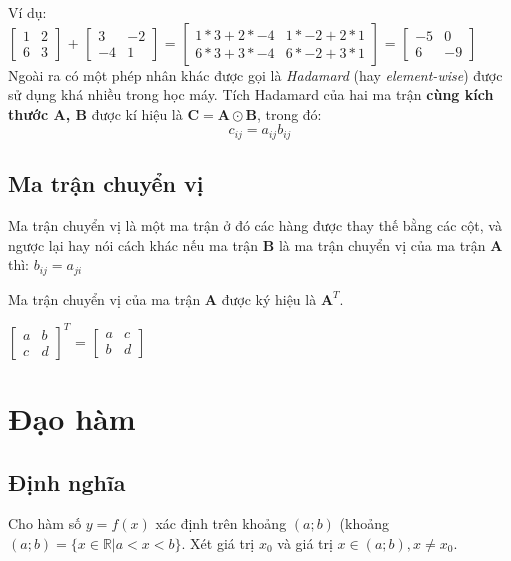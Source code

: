 Ví dụ:\\

$\begin{bmatrix}
   1 & 2 \\6 & 3
\end{bmatrix}$
+ 
$\begin{bmatrix}
3 & -2 \\
-4 & 1
\end{bmatrix}$
=
$\begin{bmatrix}
1 * 3 + 2 * -4 & 1 * -2 + 2 * 1 \\
6 * 3 + 3 * -4  & 6 * -2 + 3 * 1
\end{bmatrix}$
=
$\begin{bmatrix}
-5 & 0\\
6 & -9
\end{bmatrix}$\\

Ngoài ra có một phép nhân khác được gọi là \textit{Hadamard} (hay \textit{element-wise}) được sử dụng khá nhiều trong học máy. Tích Hadamard của hai ma trận \textbf{cùng kích thước A, B} được kí hiệu là $\textbf{C}=\textbf{A} \odot \textbf{B}$, trong đó:
\begin{equation*}
c_{ij}=a_{ij}b_{ij}
\end{equation*}
\subsection{Ma trận chuyển vị}
Ma trận chuyển vị là một ma trận ở đó các hàng được thay thế bằng các cột, và ngược lại hay nói cách khác nếu ma trận \textbf{B} là ma trận chuyển vị của ma trận \textbf{A} thì: $b_{ij} = a_{ji}$ \par
Ma trận chuyển vị của ma trận $\textbf{A}$ được ký hiệu là $\textbf{A}^T$.\\ \par

$\begin{bmatrix}
a & b\\ c&d
\end{bmatrix}^T$
=
$\begin{bmatrix}
a&c\\b&d
\end{bmatrix}$
\section{Đạo hàm}
\subsection{Định nghĩa}
Cho hàm số ${ y=f(x)}$ xác định trên khoảng ${ (a;b)}$ (khoảng ${  (a;b)=\{x\in \mathbb {R} |a<x<b\}}$. Xét giá trị ${  x_{0}}$ và giá trị ${  x\in (a;b),x\neq x_{0}}$. \par 

